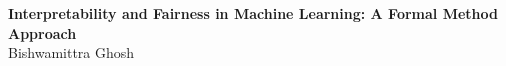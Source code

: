 \documentclass[10pt]{report}
\begin{document}
	\begin{center}
		\Large \textbf{Interpretability and Fairness in Machine Learning: A Formal Method Approach} \\
		\vspace{1em}
		\large Bishwamittra Ghosh
	\end{center}

	
		
	
	

%				
%				
%				
%				
%				
%				
%				
%				
%				
%				
%
%
%
%				
%				
%				
%				
%				
%				
%				
%				
%				
%				
%			
%	
%	
%				
%				
\end{document}
